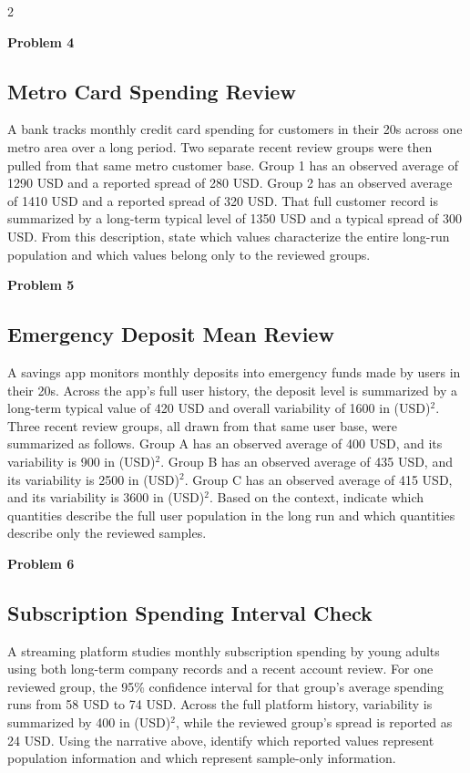 \documentclass[12pt]{article}
\newcommand{\SubsectionBox}[1]{%
\noindent\colorbox{gray!30}{\parbox{\linewidth}{\textbf{#1}}}\par\vspace{0.35cm}%
}
\begin{document}
\begin{multicols}{2}
\vspace{0.5cm}
\SubsectionBox{Problem 4}
\subsection*{Metro Card Spending Review}
A bank tracks monthly credit card spending for customers in their 20s across one metro area over a long period.
		Two separate recent review groups were then pulled from that same metro customer base.
		Group 1 has an observed average of 1290 USD and a reported spread of 280 USD.
		Group 2 has an observed average of 1410 USD and a reported spread of 320 USD.
		That full customer record is summarized by a long-term typical level of 1350 USD and a typical spread of 300 USD.
		From this description, state which values characterize the entire long-run population and which values belong only to the reviewed groups.

\vspace{0.5cm}
\SubsectionBox{Problem 5}
\subsection*{Emergency Deposit Mean Review}
A savings app monitors monthly deposits into emergency funds made by users in their 20s.
		Across the app's full user history, the deposit level is summarized by a long-term typical value of 420 USD and overall variability of 1600 in (USD)$^2$.
		Three recent review groups, all drawn from that same user base, were summarized as follows.
		Group A has an observed average of 400 USD, and its variability is 900 in (USD)$^2$.
		Group B has an observed average of 435 USD, and its variability is 2500 in (USD)$^2$.
		Group C has an observed average of 415 USD, and its variability is 3600 in (USD)$^2$.
		Based on the context, indicate which quantities describe the full user population in the long run and which quantities describe only the reviewed samples.

\vspace{0.5cm}
\SubsectionBox{Problem 6}
\subsection*{Subscription Spending Interval Check}
A streaming platform studies monthly subscription spending by young adults using both long-term company records and a recent account review.
		For one reviewed group, the 95\% confidence interval for that group's average spending runs from 58 USD to 74 USD.
		Across the full platform history, variability is summarized by 400 in (USD)$^2$, while the reviewed group's spread is reported as 24 USD.
		Using the narrative above, identify which reported values represent population information and which represent sample-only information.


\end{multicols}
\end{document}
